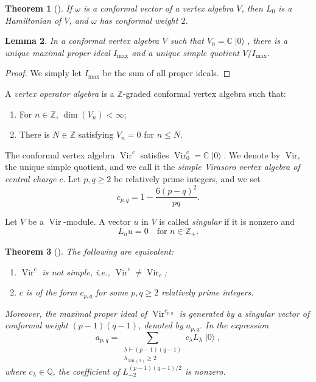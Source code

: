 \documentclass[a4paper, 12pt, reqno]{amsart}
\newtheorem{theorem}{Theorem}[section]
\newtheorem{lemma}[theorem]{Lemma}
\theoremstyle{remark}
\DeclareMathOperator{\Vir}{Vir}
\DeclareMathOperator{\len}{len}
\DeclareMathOperator{\vac}{|0\rangle}
\begin{document}
\begin{theorem}[{\cite[\S3.3]{callegaro_introduction_2017-1}}]
  \label{thr:6}
  If $\omega$ is a conformal vector of a vertex algebra $V$, then $L_0$ is a Hamiltonian of $V$, and $\omega$ has conformal weight $2$.
\end{theorem}

\begin{lemma}
  \label{lmm:3}
  In a conformal vertex algebra $V$ such that $V_0 = \mathbb{C}\vac$, there is a unique maximal proper ideal $I_{\max}$ and a unique simple quotient $V/I_{\max}$.
\end{lemma}

\begin{proof}
  We simply let $I_{\max}$ be the sum of all proper ideals.
\end{proof}

A \emph{vertex operator algebra} is a $\mathbb{Z}$-graded conformal vertex algebra such that:
\begin{enumerate}
\item For $n \in \mathbb{Z}$, $\dim(V_n) < \infty$;
\item There is $N \in \mathbb{Z}$ satisfying $V_n = 0$ for $n \le N$.
\end{enumerate}

The conformal vertex algebra $\Vir^c$ satisfies $\Vir^c_0 = \mathbb{C}\vac$.
We denote by $\Vir_c$ the unique simple quotient, and we call it the \emph{simple Virasoro vertex algebra of central charge $c$}.
Let $p, q \ge 2$ be relatively prime integers, and we set
\begin{equation*}
  c_{p, q} = 1 - \frac{6(p - q)^2}{pq}.
\end{equation*}

Let $V$ be a $\Vir$-module.
A vector $u$ in $V$ is called \emph{singular} if it is nonzero and
\begin{equation*}
  L_nu = 0 \quad \text{for $n \in \mathbb{Z}_+$}.
\end{equation*}

\begin{theorem}[{\cite{gorelik_simplicity_2007}}]
  \label{thr:7}
  The following are equivalent:
  \begin{enumerate}
  \item $\Vir^c$ is not simple, i.e., $\Vir^c \neq \Vir_c$;
  \item $c$ is of the form $c_{p, q}$ for some $p, q \ge 2$ relatively prime integers.
  \end{enumerate}
  Moreover, the maximal proper ideal of $\Vir^{c_{p, q}}$ is generated by a singular vector of conformal weight $(p - 1)(q - 1)$, denoted by $a_{p, q}$.
  In the expression
  \begin{equation*}
    a_{p, q} = \sum_{\substack{\lambda \vdash (p - 1)(q - 1) \\ \lambda_{\len(\lambda)} \ge 2}}c_{\lambda}L_{\lambda}\vac,
  \end{equation*}
  where $c_{\lambda} \in \mathbb{Q}$, the coefficient of $L_{-2}^{(p - 1)(q - 1)/2}$ is nonzero.
\end{theorem}
\end{document}
